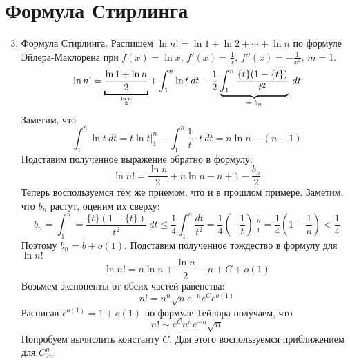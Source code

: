 \section{Формула Стирлинга}
\begin{enumerate}
    \setcounter{enumi}{2}
    \item Формула Стирлинга.  Распишем $\ln n! = \ln 1 + \ln 2 + \dotsb + \ln n$ по формуле Эйлера-Маклорена при $f(x) = \ln x, \, f'(x) = \frac{1}{x}, \, f''(x) = -\frac{1}{x^2}, \, m = 1$.
    \begin{equation*}
        \ln n! = \underbracket{\frac{\ln 1 + \ln n}{2}}_{\mathclap{\frac{\ln n}{2}}} +
        \int_{1}^{n} \ln t \: dt -
        \frac{1}{2}\underbrace{\int_{1}^{n} \frac{\{t\}(1 - \{t\})}{t^2}}_{\mathclap{=: b_n}} \: dt
    \end{equation*}
    Заметим, что
    \begin{equation*}
        \int_{1}^{n} \ln t \: dt = t\ln t \Big|_{1}^{n} - \int_{1}^{n} \frac{1}{t} \cdot t \: dt = n \ln n - (n - 1)
    \end{equation*}
    Подставим полученное выражение обратно в формулу:
    \begin{equation*}
        \ln n! = \frac{\ln n}{2} + n\ln n - n + 1 - \frac{b_n}{2}
    \end{equation*}
    Теперь воспользуемся тем же приемом, что и в прошлом примере. Заметим, что $b_n$ растут, оценим их сверху:
    \begin{equation*}
        b_n = \int_{1}^{n} = \frac{\{t\}(1 - \{t\})}{t^2} \: dt \leq
        \frac{1}{4} \int_{1}^{n} \frac{dt}{t^2} = \frac{1}{4}\left(-\frac{1}{t}\right)\Big|_{1}^{n} = \frac{1}{4}\left(1 - \frac{1}{n}\right) < \frac{1}{4}
    \end{equation*}
    Поэтому $b_n = b + o(1)$. Подставим полученное тождество в формулу для $\ln n!$
    \begin{equation*}
        \ln n! = n\ln n + \frac{\ln n}{2} - n + C + o(1)
    \end{equation*}
    Возьмем экспоненты от обеих частей равенства:
    \begin{equation*}
        n! = n^{n}\sqrt{n}e^{-n}e^{C}e^{o(1)}
    \end{equation*}
    Расписав $e^{o(1)} = 1 + o(1)$ по формуле Тейлора получаем, что
    \begin{equation*}
        n! \sim e^Cn^ne^{-n}\sqrt{n}
    \end{equation*}
    Попробуем вычислить константу $C$. Для этого воспользуемся приближением для $C_{2n}^{n}$:

\end{enumerate}

